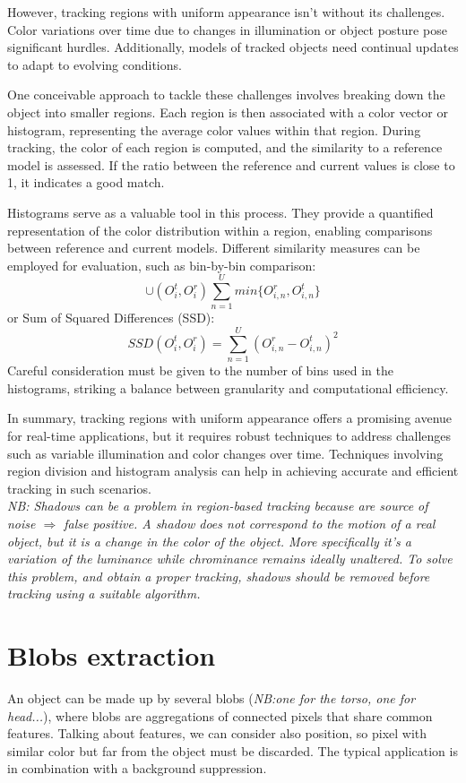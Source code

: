 However, tracking regions with uniform appearance isn't without its challenges. 
Color variations over time due to changes in illumination or object posture pose significant hurdles. 
Additionally, models of tracked objects need continual updates to adapt to evolving conditions.

One conceivable approach to tackle these challenges involves breaking down the object into smaller regions. 
Each region is then associated with a color vector or histogram, representing the average color values within that region. 
During tracking, the color of each region is computed, and the similarity to a reference model is assessed. 
If the ratio between the reference and current values is close to 1, it indicates a good match.

Histograms serve as a valuable tool in this process. 
They provide a quantified representation of the color distribution within a region, enabling comparisons between reference and current models. 
Different similarity measures can be employed for evaluation, such as bin-by-bin comparison: \[\cup (O_i^t, O_i^r) \sum_{n=1}^{U} min \{O_{i,n}^r, O_{i,n}^t\} \]
or Sum of Squared Differences (SSD): \[SSD(O_i^t, O_i^r) = \sum_{n=1}^{U} (O_{i,n}^r - O_{i,n}^t)^2 \]
Careful consideration must be given to the number of bins used in the histograms, striking a balance between granularity and computational efficiency.

In summary, tracking regions with uniform appearance offers a promising avenue for real-time applications, but it requires robust techniques to address challenges such as variable illumination and color changes over time. 
Techniques involving region division and histogram analysis can help in achieving accurate and efficient tracking in such scenarios.
\\\textit{NB: Shadows can be a problem in region-based tracking because are source of noise $\Rightarrow$ false positive. A shadow does not correspond to the motion of a real object, but it is a change in the color of the object. More specifically it's a variation of the luminance while chrominance remains ideally unaltered. To solve this problem, and obtain a proper tracking, shadows should be removed before tracking using a suitable algorithm.}

\section{Blobs extraction} 
An object can be made up by several blobs (\textit{NB:one for the torso, one for head...}), where blobs are aggregations of connected pixels that share common features.
Talking about features, we can consider also position, so pixel with similar color but far from the object must be discarded.
The typical application is in combination with a background suppression.
